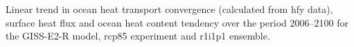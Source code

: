 \label{fig:giss_full}
Linear trend in ocean heat transport convergence (calculated from hfy data), surface heat flux and ocean heat content tendency over the period 2006--2100 for the GISS-E2-R model, rcp85 experiment and r1i1p1 ensemble.